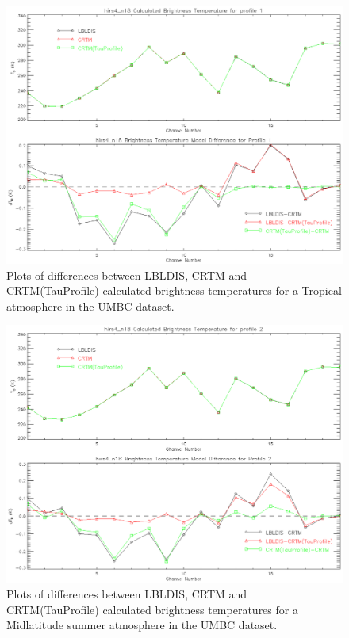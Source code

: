 \begin{figure}[htp]
  \centering{}
  \includegraphics[scale=0.8]{./graphics/Tropical_01.eps}
  \caption{Plots of differences between LBLDIS, CRTM and CRTM(TauProfile) calculated brightness temperatures for
   a Tropical atmosphere in the UMBC dataset.}
  \label{fig:Tropical_Dep}
\end{figure}

\begin{figure}[htp]
  \centering{}
  \includegraphics[scale=0.8]{./graphics/MidLat_Summer_02.eps}
  \caption{Plots of differences between LBLDIS, CRTM and CRTM(TauProfile) calculated brightness temperatures for
   a Midlatitude summer atmosphere in the UMBC dataset.}
  \label{fig:Midlatitude_Summer_Dep}
\end{figure}

